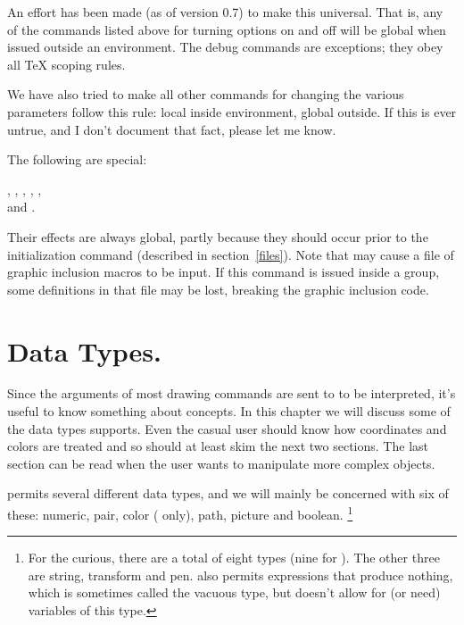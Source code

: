 \documentclass[letterpaper]{article}
\begin{document}
An effort has been made (as of version 0.7) to make this universal. That
is, any of the commands listed above for turning options on and off will
be global when issued outside an  environment. The debug
commands are exceptions; they obey all \TeX{} scoping rules.

We have also tried to make all other \mfp{} commands for changing the
various parameters follow this rule: local inside 
environment, global outside. If this is ever untrue, and I don't
document that fact, please let me know.

The following are special:
\begin{display}
,
,
,
,
,\\
and
.
\end{display}
\noindent Their effects are always global, partly because they should
occur prior to the initialization command  (described
in section~\ref{files}). Note that  may cause a file of
graphic inclusion macros to be input. If this command is issued inside a
group, some definitions in that file may be lost, breaking the graphic
inclusion code.


\clearpage
\chapter{\CMF{} Data Types.}\label{types}

Since the arguments of most \mfp{} drawing commands are sent to \MF{} to
be interpreted, it's useful to know something about \MF{} concepts. In
this chapter we will discuss some of the data types \MF{} supports.
Even the casual user should know how coordinates and colors are treated
and so should at least skim the next two sections. The last
section can be read when the user wants to manipulate more complex
objects.

\CMF{} permits  several different data types, and we will mainly be
concerned with six of these: numeric, pair, color (\MP{} only), path,
picture and boolean.%
    \footnote{For the curious, there are a total of eight
    types (nine for \MP{}). The other three are string, transform and pen.
    \MF{} also permits expressions that produce nothing, which is sometimes
    called the vacuous type, but doesn't allow for (or need) variables of
    this type.}
\end{document}
